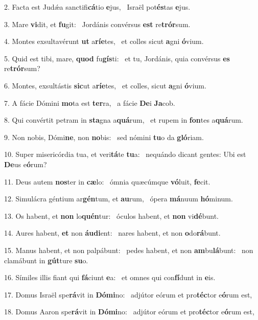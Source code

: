 2. Facta est Judǽa sanctifi\textbf{cá}tio \textbf{e}jus, \ast\  Israël pot\textbf{és}tas \textbf{e}jus.\

3. Mare \textbf{vi}dit, et \textbf{fu}git: \ast\  Jordánis convérsus \textbf{est} re\textbf{trór}sum.\

4. Montes exsultavérunt \textbf{ut} a\textbf{rí}\textbf{e}tes, \ast\  et colles sicut \textbf{a}gni \textbf{ó}vium.\

5. Quid est tibi, mare, \textbf{quod} fu\textbf{gís}ti: \ast\  et tu, Jordánis, quia convérsus \textbf{es} re\textbf{trór}sum?\

6. Montes, exsultástis \textbf{sic}ut a\textbf{rí}\textbf{e}tes, \ast\  et colles, sicut \textbf{a}gni \textbf{ó}vium.\

7. A fácie Dómini \textbf{mo}ta est \textbf{ter}ra, \ast\  a fácie \textbf{De}i \textbf{Ja}cob.\

8. Qui convértit petram in \textbf{sta}gna a\textbf{quá}rum, \ast\  et rupem in \textbf{fon}tes a\textbf{quá}rum.\

9. Non nobis, Dómi\textbf{ne}, non \textbf{no}bis: \ast\  sed nómini \textbf{tu}o da \textbf{gló}riam.\

10. Super misericórdia tua, et veri\textbf{tá}te \textbf{tu}a: \ast\  nequándo dicant gentes: Ubi est \textbf{De}us e\textbf{ó}rum?\

11. Deus autem \textbf{nos}ter in \textbf{cæ}lo: \ast\  ómnia quæcúmque \textbf{vó}luit, \textbf{fe}cit.\

12. Simulácra géntium ar\textbf{gén}tum, et \textbf{au}rum, \ast\  ópera \textbf{má}nuum \textbf{hó}minum.\

13. Os habent, et \textbf{non} lo\textbf{quén}tur: \ast\  óculos habent, et \textbf{non} vi\textbf{dé}bunt.\

14. Aures habent, \textbf{et} non \textbf{áu}\textbf{di}ent: \ast\  nares habent, et non \textbf{o}do\textbf{rá}bunt.\

15. Manus habent, et non palpábunt: \dag\  pedes habent, et non \textbf{am}bu\textbf{lá}bunt: \ast\  non clamábunt in \textbf{gút}ture \textbf{su}o.\

16. Símiles illis fiant qui \textbf{fá}ciunt \textbf{e}a: \ast\  et omnes qui con\textbf{fí}dunt in \textbf{e}is.\

17. Domus Israël spe\textbf{rá}vit in \textbf{Dó}\textbf{mi}no: \ast\  adjútor eórum et pro\textbf{téc}tor e\textbf{ó}rum est,\

18. Domus Aaron spe\textbf{rá}vit in \textbf{Dó}\textbf{mi}no: \ast\  adjútor eórum et pro\textbf{téc}tor e\textbf{ó}rum est,\

